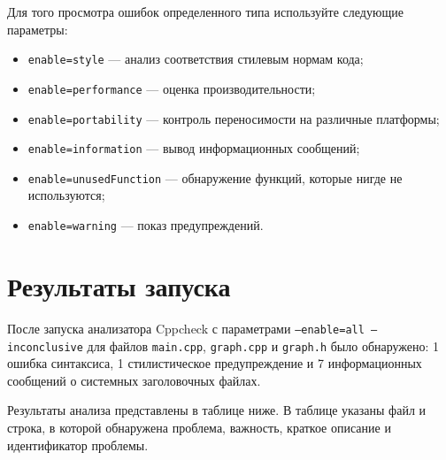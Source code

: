 \documentclass{article}[14pt]
\begin{document}
Для того просмотра ошибок определенного типа используйте следующие параметры:

\begin{itemize}
\item \texttt{enable=style} — анализ соответствия стилевым нормам кода;
\item \texttt{enable=performance} — оценка производительности;
\item \texttt{enable=portability} — контроль переносимости на различные платформы;
\item \texttt{enable=information} — вывод информационных сообщений;
\item \texttt{enable=unusedFunction} — обнаружение функций, которые нигде не используются;
\item \texttt{enable=warning} — показ предупреждений.
\end{itemize}

\pagebreak

\section{Результаты запуска}

После запуска анализатора Cppcheck с параметрами \texttt{--enable=all --inconclusive}
для файлов \texttt{main.cpp}, \texttt{graph.cpp} и \texttt{graph.h} было обнаружено:
1 ошибка синтаксиса, 1 стилистическое предупреждение и 7 информационных сообщений
о системных заголовочных файлах.
 
Результаты анализа представлены в таблице ниже. В таблице указаны файл и строка,
в которой обнаружена проблема, важность, краткое описание и идентификатор проблемы.
\end{document}
